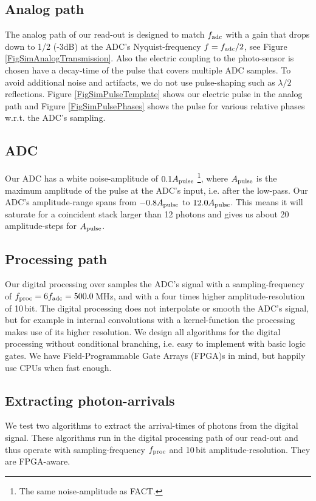 \documentclass{article}%
\begin{document}
\begin{multicols}{2}
\subsection*{Analog path}%
%
The analog path of our read-out is designed to match $f_\text{adc}{}$ with a gain that drops down to 1/2 (-3dB) at the ADC's Nyquist-frequency $f = f_\text{adc}{}/2$, see Figure \ref{FigSimAnalogTransmission}.
%
Also the electric coupling to the photo-sensor is chosen have a decay-time of the pulse that covers multiple ADC samples.
%
To avoid additional noise and artifacts, we do not use pulse-shaping such as $\lambda /2$ reflections.
%
Figure \ref{FigSimPulseTemplate} shows our electric pulse in the analog path and Figure \ref{FigSimPulsePhases} shows the pulse for various relative phases w.r.t. the ADC's sampling.
%
\subsection*{ADC}%
%
Our ADC has a white noise-amplitude of $0.1A_\text{pulse}{}$ \footnote{The same noise-amplitude as FACT.}, where $A_\text{pulse}{}$ is the maximum amplitude of the pulse at the ADC's input, i.e. after the low-pass.
%
Our ADC's amplitude-range spans from $-0.8A_\text{pulse}{}$ to $12.0A_\text{pulse}{}$. This means it will saturate for a coincident stack larger than 12 photons and gives us about 20 amplitude-steps for $A_\text{pulse}{}$.
%
\subsection*{Processing path}%
%
Our digital processing over samples the ADC's signal with a sampling-frequency of $f_\text{proc}{} = 6f_\text{adc}{} = 500.0$\,MHz, and with a four times higher amplitude-resolution of 10\,bit.
%
The digital processing does not interpolate or smooth the ADC's signal, but for example in internal convolutions with a kernel-function the processing makes use of its higher resolution.
%
We design all algorithms for the digital processing without conditional branching, i.e. easy to implement with basic logic gates.
%
We have Field-Programmable Gate Arrays (FPGA)s in mind, but happily use CPUs when fast enough.
%
\subsection*{Extracting photon-arrivals}%
%
We test two algorithms to extract the arrival-times of photons from the digital signal.
%
These algorithms run in the digital processing path of our read-out and thus operate with sampling-frequency $f_\text{proc}{}$ and 10\,bit amplitude-resolution.
%
They are FPGA-aware.
%

\end{multicols}
\end{document}
